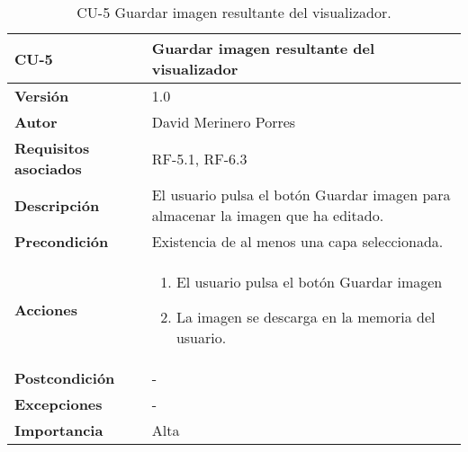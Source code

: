\begin{table}[p]
	\centering
	\begin{tabularx}{\linewidth}{ p{} p{} }
		\toprule
		\textbf{CU-5}    & \textbf{Guardar imagen resultante del visualizador}\\
		\toprule
		\textbf{Versión}              & 1.0    \\
		\textbf{Autor}                & David Merinero Porres \\
		\textbf{Requisitos asociados} & RF-5.1, RF-6.3 \\
		\textbf{Descripción}          & El usuario pulsa el botón Guardar imagen para almacenar la imagen que ha editado. \\
		\textbf{Precondición}         & Existencia de al menos una capa seleccionada. \\
		\textbf{Acciones}             &
		\begin{enumerate}
			\def\labelenumi{\arabic{enumi}.}
			\tightlist
			\item El usuario pulsa el botón Guardar imagen
			\item La imagen se descarga en la memoria del usuario.
		\end{enumerate}\\
		\textbf{Postcondición}        & - \\
		\textbf{Excepciones}          & - \\
		\textbf{Importancia}          & Alta \\
		\bottomrule
	\end{tabularx}
	\caption{CU-5 Guardar imagen resultante del visualizador.}
\end{table}

